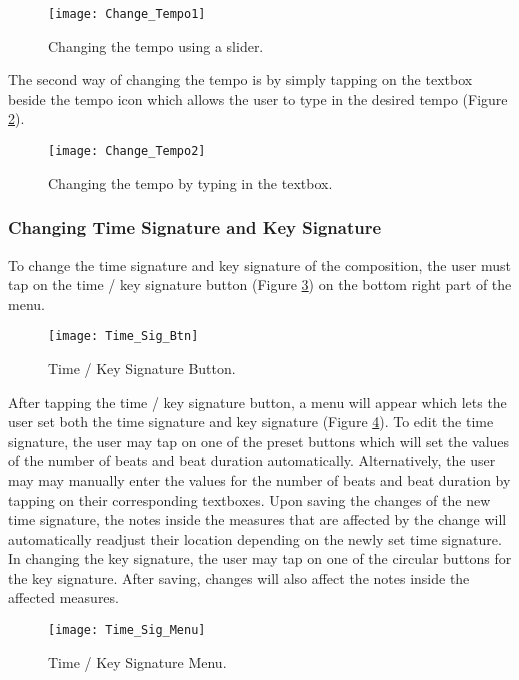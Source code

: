 \begin{figure}[H]
	\centering
	\texttt{[image: Change\_Tempo1]}
    \caption{Changing the tempo using a slider.}
    \label{fig:tempo-slider}
\end{figure}

The second way of changing the tempo is by simply tapping on the textbox beside the tempo icon which allows the user to type in the desired tempo (Figure \ref{fig:tempo-type}).

\begin{figure}[H]
	\centering
	\texttt{[image: Change\_Tempo2]}
    \caption{Changing the tempo by typing in the textbox.}
    \label{fig:tempo-type}
\end{figure}

\subsubsection{Changing Time Signature and Key Signature}
To change the time signature and key signature of the composition, the user must tap on the time / key signature button (Figure \ref{fig:tim-sig-btn}) on the bottom right part of the menu.

\begin{figure}[H]
	\centering
	\texttt{[image: Time\_Sig\_Btn]}
    \caption{Time / Key Signature Button.}
    \label{fig:tim-sig-btn}
\end{figure}

After tapping the time / key signature button, a menu will appear which lets the user set both the time signature and key signature (Figure \ref{fig:tim-sig-menu}). To edit the time signature, the user may tap on one of the preset buttons which will set the values of the number of beats and beat duration automatically. Alternatively, the user may may manually enter the values for the number of beats and beat duration by tapping on their corresponding textboxes. Upon saving the changes of the new time signature, the notes inside the measures that are affected by the change will automatically readjust their location depending on the newly set time signature. In changing the key signature, the user may tap on one of the circular buttons for the key signature. After saving, changes will also affect the notes inside the affected measures.

\begin{figure}[H]
	\centering
	\texttt{[image: Time\_Sig\_Menu]}
    \caption{Time / Key Signature Menu.}
    \label{fig:tim-sig-menu}
\end{figure}

